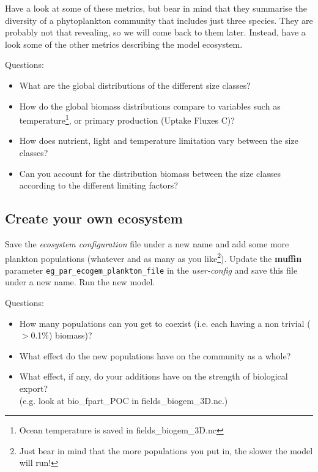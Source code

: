 \documentclass[11pt,fleqn]{book} %
\begin{document}
\pagebreak

Have a look at some of these metrics, but bear in mind that they summarise the diversity of a phytoplankton community that includes just three species. They are probably not that revealing, so we will come back to them later. Instead, have a look some of the other metrics describing the model ecosystem.

Questions:

\begin{itemize}
\vspace{1mm} 
\item What are the global distributions of the different size classes?
\vspace{1mm} 
\item How do the global biomass distributions compare to variables such as temperature\footnote{Ocean temperature is saved in \textsf{\scriptsize fields\_biogem\_3D.nc}}, or primary production (\textsf{\footnotesize Uptake Fluxes C})?
\vspace{1mm} 
\item How does nutrient, light and temperature limitation vary between the size classes?
\vspace{1mm} 
\item Can you account for the distribution biomass between the size classes according to the different limiting factors?
\end{itemize}
\vspace{2mm} 


\subsection{Create your own ecosystem} 

Save the \textit{ecosystem configuration} file under a new name and add some more plankton populations (whatever and as many as you like\footnote{Just bear in mind that the more populations you put in, the slower the model will run!}). Update the \textbf{muffin} parameter \texttt{eg\_par\_ecogem\_plankton\_file} in the \textit{user-config} and save this file under a new name.  Run the new model.

Questions: 

\begin{itemize}
\vspace{1mm}
\item How many populations can you get to coexist (i.e. each having a non trivial ($>$0.1\%) biomass)? 
\vspace{1mm}
\item What effect do the new populations have on the community as a whole?
\vspace{1mm} \item What effect, if any, do your additions have on the strength of biological export?\\(e.g. look at \textsf{\footnotesize bio\_fpart\_POC} in \textsf{\footnotesize fields\_biogem\_3D.nc}.)
\end{itemize}
\vspace{2mm} 
\end{document}
